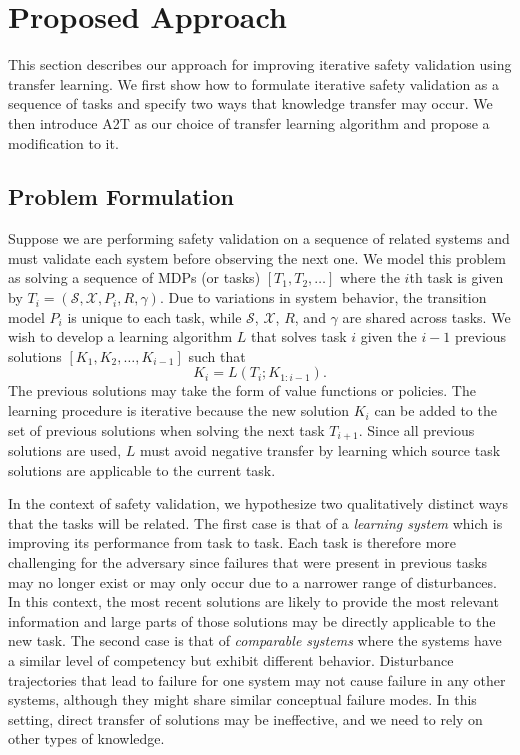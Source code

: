 \section{Proposed Approach}
This section describes our approach for improving iterative safety validation using transfer learning. We first show how to formulate iterative safety validation as a sequence of tasks and specify two ways that knowledge transfer may occur. We then introduce A2T as our choice of transfer learning algorithm and propose a modification to it.

\subsection{Problem Formulation}
Suppose we are performing safety validation on a sequence of related systems and  must validate each system before observing the next one. We model this problem as solving a sequence of MDPs (or tasks) $[T_1, T_2, \ldots]$ where the $i$th task is given by $T_i = (\mathcal{S}, \mathcal{X}, P_i, R, \gamma)$. Due to variations in system behavior, the transition model $P_i$ is unique to each task, while $\mathcal{S}$, $\mathcal{X}$, $R$, and $\gamma$ are shared across tasks. We wish to develop a learning algorithm $L$ that solves task $i$ given the $i-1$ previous solutions $[K_1, K_2, \ldots, K_{i-1}]$ such that
\begin{equation}
    K_i = L(T_i; K_{1:i-1}) \text{.}
\end{equation}
The previous solutions may take the form of value functions or policies. The learning procedure is iterative because the new solution $K_i$ can be added to the set of previous solutions when solving the next task $T_{i+1}$. Since all previous solutions are used, $L$ must avoid negative transfer by learning which source task solutions are applicable to the current task.



In the context of safety validation, we hypothesize two qualitatively distinct ways that the tasks will be related. The first case is that of a \emph{learning system} which is improving its performance from task to task. Each task is therefore more challenging for the adversary since failures that were present in previous tasks may no longer exist or may only occur due to a narrower range of disturbances. In this context, the most recent solutions are likely to provide the most relevant information and large parts of those solutions may be directly applicable to the new task. The second case is that of \emph{comparable systems} where the systems have a similar level of competency but exhibit different behavior. Disturbance trajectories that lead to failure for one system may not cause failure in any other systems, although they might share similar conceptual failure modes. In this setting, direct transfer of solutions may be ineffective, and we need to rely on other types of knowledge. 


